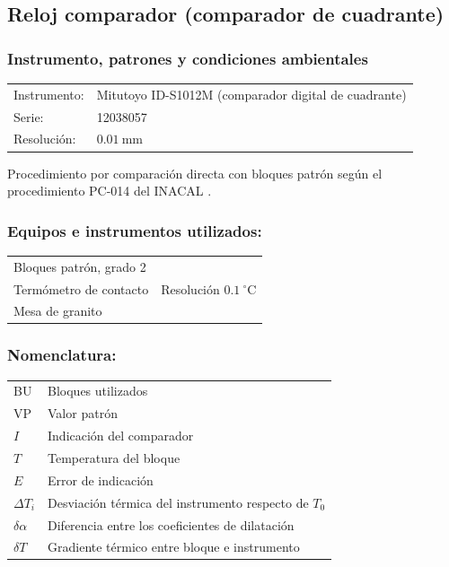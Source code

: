 \subsection{Reloj comparador (comparador de cuadrante)}
\label{sec:reloj-comparador}

\subsubsection{Instrumento, patrones y condiciones ambientales}

\begin{tabular}{ll}
Instrumento: & Mitutoyo ID-S1012M (comparador digital de cuadrante)\\[3pt]
Serie:       & 12038057\\[3pt]
Resolución:  & $0.01\ \text{mm}$\\[3pt]
\end{tabular}

\vspace{6pt}
Procedimiento por comparación directa con bloques patrón según el procedimiento
PC-014 del INACAL \parencite{inacal_pc014}.

\vspace{12pt}
\subsubsection*{Equipos e instrumentos utilizados:}
\begin{tabular}{ll}
Bloques patrón, grado 2 & \parencite{iso3650_1998}\\[3pt]
Termómetro de contacto & Resolución $0.1\ ^\circ\text{C}$\\[3pt]
Mesa de granito & \parencite{cem_di010}
\end{tabular}

\vspace{12pt}
\subsubsection*{Nomenclatura:}
\begin{tabular}{ll}
BU  & Bloques utilizados\\[3pt]
VP  & Valor patrón\\[3pt]
$I$ & Indicación del comparador\\[3pt]
$T$ & Temperatura del bloque\\[3pt]
$E$ & Error de indicación\\[3pt]
$\Delta T_i$ & Desviación térmica del instrumento respecto de $T_0$\\[3pt]
$\delta\alpha$ & Diferencia entre los coeficientes de dilatación\\[3pt]
$\delta T$ & Gradiente térmico entre bloque e instrumento
\end{tabular}


